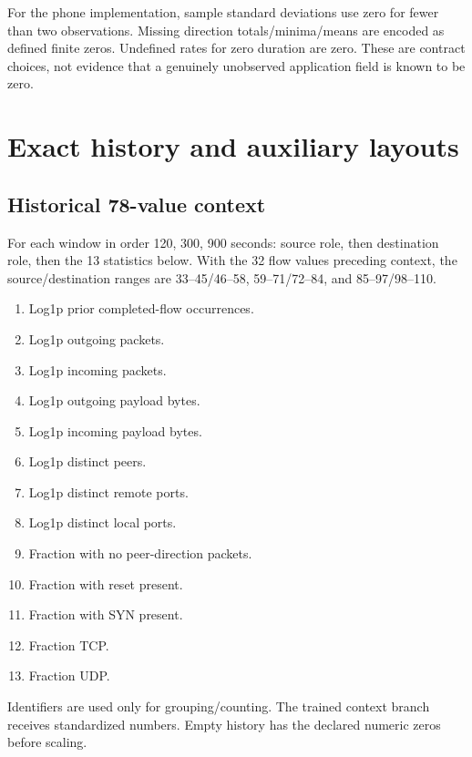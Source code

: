 \documentclass[11pt,a4paper,oneside]{report}
\begin{document}
For the phone implementation, sample standard deviations use zero for fewer than two observations. Missing direction totals/minima/means are encoded as defined finite zeros. Undefined rates for zero duration are zero. These are contract choices, not evidence that a genuinely unobserved application field is known to be zero.

\chapter{Exact history and auxiliary layouts}
\section{Historical 78-value context}
For each window in order 120, 300, 900 seconds: source role, then destination role, then the 13 statistics below. With the 32 flow values preceding context, the source/destination ranges are 33--45/46--58, 59--71/72--84, and 85--97/98--110.
\begin{enumerate}
\item Log1p prior completed-flow occurrences.
\item Log1p outgoing packets.
\item Log1p incoming packets.
\item Log1p outgoing payload bytes.
\item Log1p incoming payload bytes.
\item Log1p distinct peers.
\item Log1p distinct remote ports.
\item Log1p distinct local ports.
\item Fraction with no peer-direction packets.
\item Fraction with reset present.
\item Fraction with SYN present.
\item Fraction TCP.
\item Fraction UDP.
\end{enumerate}
Identifiers are used only for grouping/counting. The trained context branch receives standardized numbers. Empty history has the declared numeric zeros before scaling.
\end{document}
